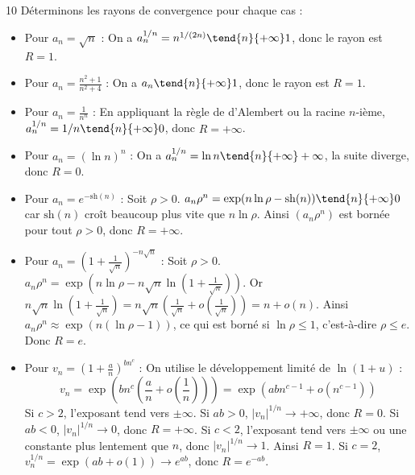 \begin{correction}{10}
Déterminons les rayons de convergence pour chaque cas :
\begin{itemize}
 \item Pour $a_n = \sqrt{n}$ : On a $a_n^{1/n} = n^{1/(2n)} \tend{n}{+\infty} 1$, donc le rayon est $R=1$. 
 \item Pour $a_n = \frac{n^2+1}{n^2+4}$ : On a $a_n \tend{n}{+\infty} 1$, donc le rayon est $R=1$. 
 \item Pour $a_n = \frac{1}{n^n}$ : En appliquant la règle de d'Alembert ou la racine $n$-ième, $a_n^{1/n} = 1/n \tend{n}{+\infty} 0$, donc $R=+\infty$. 
 \item Pour $a_n = (\ln n)^n$ : On a $a_n^{1/n} = \ln n \tend{n}{+\infty} +\infty$, la suite diverge, donc $R=0$. 
 \item Pour $a_n = e^{-\mathrm{sh}(n)}$ : Soit $\rho>0$. $a_n \rho^n = \exp(n\ln \rho - \mathrm{sh}(n)) \tend{n}{+\infty} 0$ car $\mathrm{sh}(n)$ croît beaucoup plus vite que $n\ln \rho$. Ainsi $(a_n \rho^n)$ est bornée pour tout $\rho>0$, donc $R=+\infty$. 
 \item Pour $a_n = \left(1+\frac{1}{\sqrt{n}}\right)^{-n\sqrt{n}}$ : Soit $\rho>0$. $a_n \rho^n = \exp\left(n\ln \rho - n\sqrt{n}\ln\left(1+\frac{1}{\sqrt{n}}\right)\right)$. Or $n\sqrt{n}\ln\left(1+\frac{1}{\sqrt{n}}\right) = n\sqrt{n}\left(\frac{1}{\sqrt{n}} + o\left(\frac{1}{\sqrt{n}}\right)\right) = n + o(n)$. Ainsi $a_n \rho^n \approx \exp(n(\ln \rho - 1))$, ce qui est borné si $\ln \rho \le 1$, c'est-à-dire $\rho \le e$. Donc $R=e$. 
 \item Pour $v_n = \left(1+\frac{a}{n}\right)^{bn^c}$ : 
 On utilise le développement limité de $\ln(1+u)$ : 
 $$ v_n = \exp\left( b n^c \left( \frac{a}{n} + o\left(\frac{1}{n}\right) \right) \right) = \exp\left( ab n^{c-1} + o(n^{c-1}) \right) $$ 
 Si $c > 2$, l'exposant tend vers $\pm \infty$. Si $ab > 0$, $|v_n|^{1/n} \to +\infty$, donc $R=0$. Si $ab < 0$, $|v_n|^{1/n} \to 0$, donc $R=+\infty$. 
 Si $c < 2$, l'exposant tend vers $\pm\infty$ ou une constante plus lentement que $n$, donc $|v_n|^{1/n} \to 1$. Ainsi $R=1$. 
 Si $c = 2$, $v_n^{1/n} = \exp(ab + o(1)) \to e^{ab}$, donc $R = e^{-ab}$. 
\end{itemize}
\end{correction}

